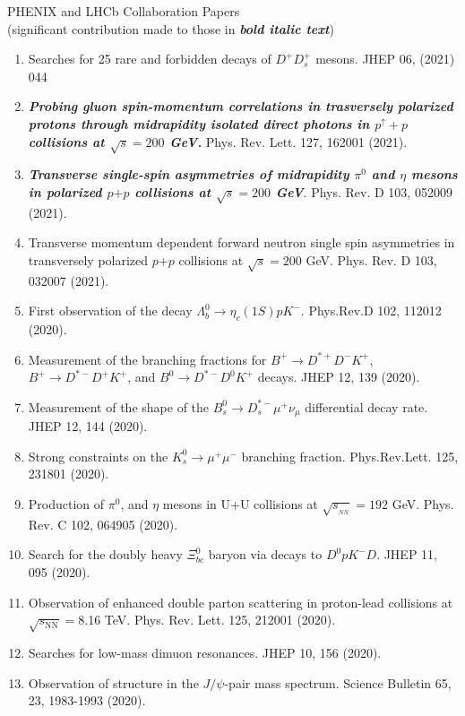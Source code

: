 \documentclass[11pt]{article}
\begin{document}
\begin{flushleft}
\begin{center}
\vspace{14pt}
\begin{flushleft}
\large PHENIX and LHCb Collaboration Papers\\ (significant contribution made to those in \textbf{\textit{bold italic text}})\\
\end{flushleft}

\begin{enumerate}
	\normalsize
	
	
		\item Searches for 25 rare and forbidden decays of $D^+D_s^+ $ mesons. JHEP 06, (2021) 044
		\item \textbf{\textit{Probing gluon spin-momentum correlations in trasversely polarized protons through midrapidity isolated direct photons in $p^\uparrow+p$ collisions at $\sqrt{s}=200$ GeV.}} Phys. Rev. Lett. 127, 162001 (2021).
		\item {\bf{\textit{Transverse single-spin asymmetries of midrapidity $\pi^0$ and $\eta$ mesons in polarized $p$$+$$p$ collisions at $\sqrt{s}=200$ GeV}}}. Phys. Rev. D 103, 052009 (2021).
	
		\item Transverse momentum dependent forward neutron single spin asymmetries in transversely polarized $p$$+$$p$ collisions at $\sqrt{s}=200$ GeV. Phys. Rev. D 103, 032007 (2021).
		\item First observation of the decay $\Lambda_b^0 \to \eta_c(1S) p K^-$. Phys.Rev.D 102, 112012 (2020).
		\item Measurement of the branching fractions for $B^+\to D^{*+}D^-K^+$, $B^+\to D^{*-}D^+K^+$, and $B^0\to D^{*-}D^0K^+$ decays. JHEP 12, 139 (2020).
		\item Measurement of the shape of the $B_s^0\rightarrow D_s^{*-}\mu^+\nu_\mu$ differential decay rate. JHEP 12, 144 (2020).
		\item Strong constraints on the $K_s^0\rightarrow\mu^+\mu^-$ branching fraction. Phys.Rev.Lett. 125, 231801 (2020).
		\item Production of $\pi^0$, and $\eta$ mesons in U+U collisions at $\sqrt{s_{_{NN}}}=192$ GeV. Phys. Rev. C 102, 064905 (2020).
		\item Search for the doubly heavy $\mathit{\Xi}_{bc}^{0}$ baryon via decays to $D^0pK^-D$. JHEP 11, 095 (2020).
		\item Observation of enhanced double parton scattering in proton-lead collisions at $\sqrt{s_\mathrm{NN}}=$8.16 TeV. Phys. Rev. Lett. 125, 212001 (2020).
		\item Searches for low-mass dimuon resonances. JHEP 10, 156 (2020).
		\item Observation of structure in the $J/\psi$-pair mass spectrum. Science Bulletin 65, 23, 1983-1993 (2020).
		

\end{enumerate}
\end{center}
\end{flushleft}
\end{document}
